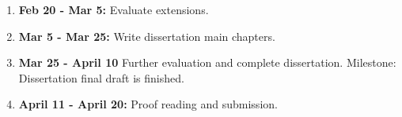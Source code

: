 \begin{enumerate}
\item {\bf Feb 20 - Mar 5:} Evaluate extensions. 

\item {\bf Mar 5 - Mar 25:} Write dissertation main chapters.

\item {\bf Mar 25 - April 10}  Further evaluation and complete dissertation.
{Milestone: } Dissertation final draft is finished.

\item {\bf April 11 - April 20:} Proof reading and submission.

\end{enumerate}


 

